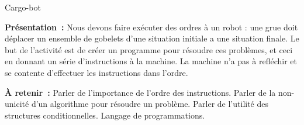 \documentclass[a4paper,11pt]{article}
\begin{document}
 
 
\begin{center}
\huge
Cargo-bot
\end{center}

\textbf{Présentation~:}
Nous devons faire exécuter des ordres à un robot : une grue doit déplacer un ensemble de gobelets d’une situation initiale a une situation finale. Le but de l'activité est de créer un programme pour résoudre ces problèmes, et ceci en donnant un série d'instructions à la machine. La machine n'a pas à refléchir et se contente d'effectuer les instructions dans l'ordre.


\textbf{\`A retenir~:} 
Parler de l’importance de l’ordre des instructions.
Parler de la non-unicité d’un algorithme pour résoudre un problème.
Parler de l’utilité des structures conditionnelles.
Langage de programmations.
\end{document}
